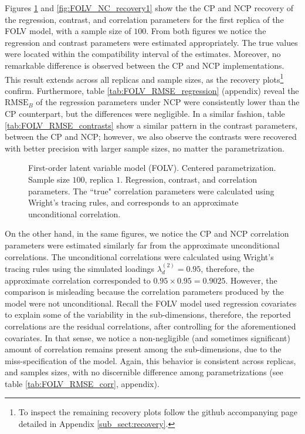Figures \ref{fig:FOLV_CE_recovery1} and \ref{fig:FOLV_NC_recovery1} show the the CP and NCP recovery of the regression, contrast, and correlation parameters for the first replica of the FOLV model, with a sample size of $100$. From both figures we notice the regression and contrast parameters were estimated appropriately. The true values were located within the compatibility interval of the estimates. Moreover, no remarkable difference is observed between the CP and NCP implementations. This result extends across all replicas and sample sizes, as the recovery plots\footnote{To inspect the remaining recovery plots follow the github accompanying page detailed in Appendix \ref{sub_sect:recovery}.} confirm. Furthermore, table \ref{tab:FOLV_RMSE_regression} (appendix) reveal the $\text{RMSE}_{B}$ of the regression parameters under NCP were consistently lower than the CP counterpart, but the differences were negligible. In a similar fashion, table \ref{tab:FOLV_RMSE_contrasts} show a similar pattern in the contrast parameters, between the CP and NCP; however, we also observe the contrasts were recovered with better precision with larger sample sizes, no matter the parametrization.
%
\begin{figure}[H]
	\centering
	\begin{subfigure}
		\texttt{[image: FOLV\_CE\_J100\_Ndata1\_regression]}
	\end{subfigure}
	\begin{subfigure}
		\texttt{[image: FOLV\_CE\_J100\_Ndata1\_corr]}
	\end{subfigure}
	\caption[First-order latent variable model (FOLV). Centered parametrization. Sample size $100$, replica $1$. Regression, contrast, and correlation parameters.]%
	{First-order latent variable model (FOLV). Centered parametrization. Sample size $100$, replica $1$. Regression, contrast, and correlation parameters. The ``true" correlation parameters were calculated using Wright's tracing rules, and corresponds to an approximate unconditional correlation.}
	\label{fig:FOLV_CE_recovery1}
\end{figure}

On the other hand, in the same figures, we notice the CP and NCP correlation parameters were estimated similarly far from the approximate unconditional correlations. The unconditional correlations were calculated using Wright's tracing rules \cite{Beaujean_2014} using the simulated loadings $\lambda^{(2)}_{d} = 0.95$, therefore, the approximate correlation corresponded to $0.95 \times 0.95 = 0.9025$. However, the comparison is misleading because the correlation parameters produced by the model were not unconditional. Recall the FOLV model used regression covariates to explain some of the variability in the sub-dimensions, therefore, the reported correlations are the residual correlations, after controlling for the aforementioned covariates. In that sense, we notice a non-negligible (and sometimes significant) amount of correlation remains present among the sub-dimensions, due to the miss-specification of the model. Again, this behavior is consistent across replicas, and samples sizes, with no discernible difference among parametrizations (see table \ref{tab:FOLV_RMSE_corr}, appendix).

